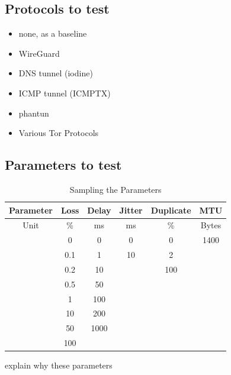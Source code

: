 \subsection{Protocols to test}
\begin{itemize}
  \item none, as a baseline
  \item WireGuard
  \item DNS tunnel (iodine)
  \item ICMP tunnel (ICMPTX)
  \item phantun
  \item Various Tor Protocols
\end{itemize}


\subsection{Parameters to test}
\begin{table}[]
	\centering
	\footnotesize
	\begin{tabular}{cccccc}
		\toprule
		\textbf{Parameter} & \textbf{Loss} & \textbf{Delay} & \textbf{Jitter} & \textbf{Duplicate} & \textbf{MTU} \\ \midrule
		\rowcolor[HTML]{EFEFEF}
		Unit               & \%            & ms             & ms              & \%                 & Bytes        \\
		& 0             & 0              & 0               & 0                  & 1400         \\
		\rowcolor[HTML]{EFEFEF}
		& 0.1           & 1              & 10              & 2                  &              \\
		& 0.2           & 10             &                 & 100                &              \\
		\rowcolor[HTML]{EFEFEF}
		& 0.5           & 50             &                 &                    &              \\
		& 1             & 100            &                 &                    &              \\
		\rowcolor[HTML]{EFEFEF}
		& 10            & 200            &                 &                    &              \\
		& 50            & 1000           &                 &                    &              \\
		\rowcolor[HTML]{EFEFEF}
		& 100           &                &                 &                    &              \\ \bottomrule
	\end{tabular}
	\caption{Sampling the Parameters}
	\label{tab:parameters}
\end{table}
explain why these parameters







